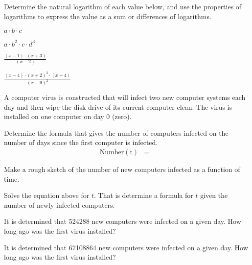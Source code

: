 \begin{problem}
\item Determine the natural logarithm of each value below, and use the
  properties of logarithms to express the value as a sum or
  differences of logarithms.
  \begin{subproblem}
  \item $a\cdot b \cdot c$
    \vfill
  \item $a\cdot b^2 \cdot c \cdot d^3$
    \vfill
  \item $\frac{(x-1)\cdot (x+3)}{(x-2)}$
    \vfill
  \item $\frac{(x-4)\cdot (x+2)^3 \cdot (x+4)}{(x-9)^2}$
    \vfill
  \end{subproblem}

\clearpage

\item A computer virus is constructed that will infect two new
  computer systems each day and then wipe the disk drive of its
  current computer clean.  The virus is installed on one computer on
  day 0 (zero).
  \begin{subproblem}
    \item Determine the formula that gives the number of computers
      infected on the number of days since the first computer is
      infected.
      \begin{eqnarray*}
        \mathrm{Number(t)} & = & 
      \end{eqnarray*}
    \item Make a rough sketch of the number of new computers infected
      as a function of time.
      \vfill
    \item Solve the equation above for $t$. That is determine a formula for
      $t$ given the number of newly infected computers.
      \vfill
    \item It is determined that 524288 new computers were infected on
      a given day. How long ago was the first virus installed?
      \vspace{3em}
    \item It is determined that 67108864 new computers were infected
      on a given day. How long ago was the first virus installed?
      \vspace{3em}
  \end{subproblem}

\clearpage


\end{problem}
